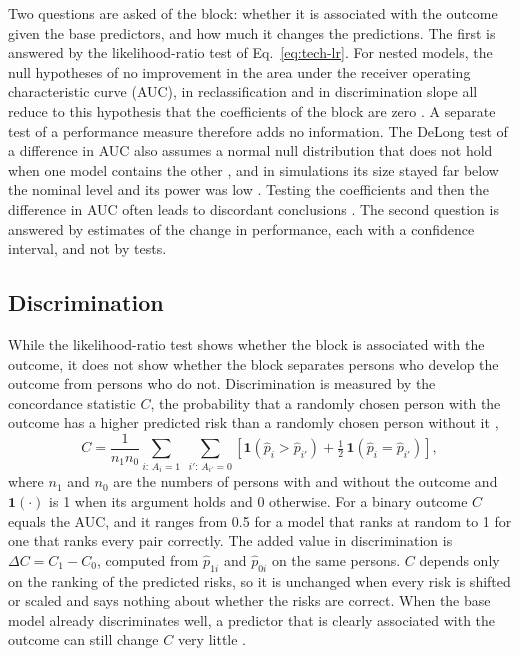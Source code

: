 Two questions are asked of the block: whether it is associated with the outcome given the base predictors, and how much it changes the predictions.
The first is answered by the likelihood-ratio test of Eq.~\eqref{eq:tech-lr}.
For nested models, the null hypotheses of no improvement in the area under the receiver operating characteristic curve (AUC), in reclassification and in discrimination slope all reduce to this hypothesis that the coefficients of the block are zero \cite{pepe2013testing}.
A separate test of a performance measure therefore adds no information.
The DeLong test of a difference in AUC also assumes a normal null distribution that does not hold when one model contains the other \cite{demler2012delong}, and in simulations its size stayed far below the nominal level and its power was low \cite{pepe2013testing}.
Testing the coefficients and then the difference in AUC often leads to discordant conclusions \cite{vickers2011onetest}.
The second question is answered by estimates of the change in performance, each with a confidence interval, and not by tests.

\subsection{Discrimination}
\label{sec:tech-discrimination}

While the likelihood-ratio test shows whether the block is associated with the outcome, it does not show whether the block separates persons who develop the outcome from persons who do not.
Discrimination is measured by the concordance statistic $C$, the probability that a randomly chosen person with the outcome has a higher predicted risk than a randomly chosen person without it \cite{harrell1996multivariable},
\begin{equation}
  C = \frac{1}{n_1 n_0} \sum_{i:\, A_i = 1} \; \sum_{i':\, A_{i'} = 0}
  \left[ \mathbf{1}(\hat p_i > \hat p_{i'}) + \tfrac{1}{2}\, \mathbf{1}(\hat p_i = \hat p_{i'}) \right],
  \label{eq:tech-cindex}
\end{equation}
where $n_1$ and $n_0$ are the numbers of persons with and without the outcome and $\mathbf{1}(\cdot)$ is 1 when its argument holds and 0 otherwise.
For a binary outcome $C$ equals the AUC, and it ranges from 0.5 for a model that ranks at random to 1 for one that ranks every pair correctly.
The added value in discrimination is $\Delta C = C_1 - C_0$, computed from $\hat p_{1i}$ and $\hat p_{0i}$ on the same persons.
$C$ depends only on the ranking of the predicted risks, so it is unchanged when every risk is shifted or scaled and says nothing about whether the risks are correct.
When the base model already discriminates well, a predictor that is clearly associated with the outcome can still change $C$ very little \cite{pencina2008nri, steyerberg2010performance}.

